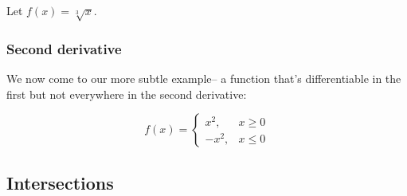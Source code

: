 Let $f(x)=\sqrt[3]{x}$.


\subsubsection*{Second derivative}
We now come to our more subtle example-- a function that's
differentiable in the first but not everywhere in the second
derivative:

\[f(x)=\begin{cases}
  x^2,&x\geq0\\
  -x^2,&x\leq0
  \end{cases}\]

\subsection{Intersections}

